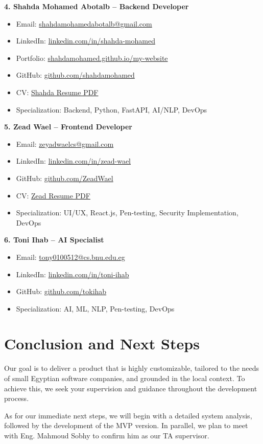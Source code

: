 \documentclass[20pt,a4paper]{article}
\begin{document}
\textbf{4. Shahda Mohamed Abotalb – Backend Developer}  
\begin{itemize}
    \item Email: \href{mailto:shahdamohamedabotalb@gmail.com}{shahdamohamedabotalb@gmail.com}
    \item LinkedIn: \href{https://www.linkedin.com/in/shahda-mohamed-178537280}{linkedin.com/in/shahda-mohamed}
    \item Portfolio: \href{https://shahdamohamed.github.io/my-website}{shahdamohamed.github.io/my-website}
    \item GitHub: \href{https://github.com/shahdamohamed}{github.com/shahdamohamed}
    \item CV: \href{https://shahdamohamed.github.io/my-website/assets/resume.pdf}{Shahda Resume PDF}
    \item Specialization: Backend, Python, FastAPI, AI/NLP, DevOps
\end{itemize}

\textbf{5. Zead Wael – Frontend Developer}  
\begin{itemize}
    \item Email: \href{mailto:zeyadwaelcs@gmail.com}{zeyadwaelcs@gmail.com}
    \item LinkedIn: \href{https://www.linkedin.com/in/zead-wael}{linkedin.com/in/zead-wael}
    \item GitHub: \href{https://github.com/ZeadWael}{github.com/ZeadWael}
    \item CV: \href{https://drive.google.com/drive/folders/1mSTjcvvaDnJasdTxr2x36CddeTrQR5dQ?usp=sharing}{Zead Resume PDF}
    \item Specialization: UI/UX, React.js, Pen-testing, Security Implementation, DevOps
\end{itemize}

\textbf{6. Toni Ihab – AI Specialist}  
\begin{itemize}
    \item Email: \href{mailto:tony0100512@cs.bnu.edu.eg}{tony0100512@cs.bnu.edu.eg}
    \item LinkedIn: \href{https://www.linkedin.com/in/toni-ihab/}{linkedin.com/in/toni-ihab}
    \item GitHub: \href{https://github.com/tokihab}{github.com/tokihab}
    \item Specialization: AI, ML, NLP, Pen-testing, DevOps 
\end{itemize}
\section{Conclusion and Next Steps}
Our goal is to deliver a product that is highly customizable, tailored to the needs of small Egyptian software companies, and grounded in the local context. To achieve this, we seek your supervision and guidance throughout the development process.  

As for our immediate next steps, we will begin with a detailed system analysis, followed by the development of the MVP version. In parallel, we plan to meet with Eng. Mahmoud Sobhy to confirm him as our TA supervisor.  
\end{document}
